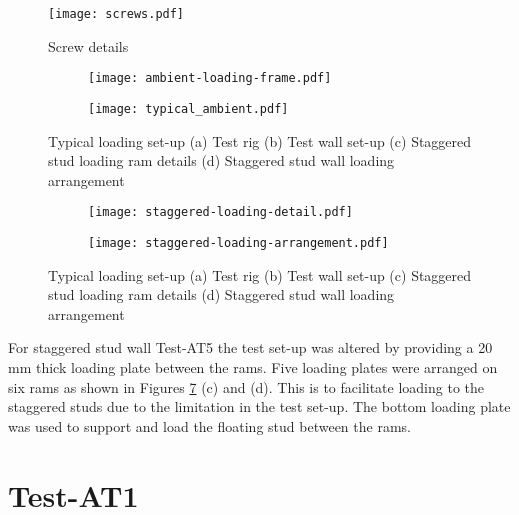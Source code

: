 \begin{figure}[htbp]
	\centering
			\texttt{[image: screws.pdf]}
		\caption{Screw details}
		\label{fig:screw-details}
\end{figure}
\begin{figure}
	\centering
	\begin{subfigure}[b]{0.75\textwidth}
		\centering
		\texttt{[image: ambient-loading-frame.pdf]}
		\caption{}
		\label{subfig:ambient-loading-frame}
	\end{subfigure}
	\begin{subfigure}[b]{0.5\textwidth}
		\centering
		\texttt{[image: typical\_ambient.pdf]}
		\caption{}
		\label{subfig:typical_ambient}
	\end{subfigure}
	   \caption{Typical loading set-up (a) Test rig (b) Test wall set-up (c) Staggered stud loading ram details (d) Staggered stud wall loading arrangement}
	   \label{fig:typical-loading-a}
\end{figure}
\begin{figure}
	\ContinuedFloat
	\centering
	\begin{subfigure}[b]{0.5\textwidth}
		\centering
		\texttt{[image: staggered-loading-detail.pdf]}
		\caption{}
		\label{subfig:staggered-loading-detail}
	\end{subfigure}
	\begin{subfigure}[b]{0.75\textwidth}
		\centering
		\texttt{[image: staggered-loading-arrangement.pdf]}
		\caption{}
		\label{subfig:staggered-loading-arrangement}
	\end{subfigure}
	   \caption{Typical loading set-up (a) Test rig (b) Test wall set-up (c) Staggered stud loading ram details (d) Staggered stud wall loading arrangement}
	   \label{fig:typical-loading}
\end{figure}

For staggered stud wall Test-AT5 the test set-up was altered by providing a 20 mm thick loading plate between the rams. Five loading plates were arranged on six rams as shown in Figures \ref{fig:typical-loading} (c) and (d). This is to facilitate loading to the staggered studs due to the limitation in the test set-up. The bottom loading plate was used to support and load the floating stud between the rams.  

\section{Test-AT1}\label{sec:Test-AT1}

